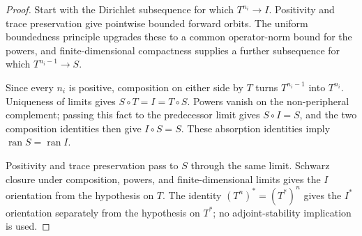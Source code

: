 \begin{proof}
    \leanok
    Start with the Dirichlet subsequence for which $T^{n_i}\to I$. Positivity
    and trace preservation give pointwise bounded forward orbits. The uniform
    boundedness principle upgrades these to a common operator-norm bound for
    the powers, and finite-dimensional compactness supplies a further
    subsequence for which $T^{n_i-1}\to S$.

    Since every $n_i$ is positive, composition on either side by $T$ turns
    $T^{n_i-1}$ into $T^{n_i}$. Uniqueness of limits gives
    $S\circ T=I=T\circ S$. Powers vanish on the non-peripheral complement;
    passing this fact to the predecessor limit gives $S\circ I=S$, and the
    two composition identities then give $I\circ S=S$. These absorption
    identities imply $\operatorname{ran}S=\operatorname{ran}I$.

    Positivity and trace preservation pass to $S$ through the same limit.
    Schwarz closure under composition, powers, and finite-dimensional limits
    gives the $I$ orientation from the hypothesis on $T$. The identity
    $(T^n)^*=(T^*)^n$ gives the $I^*$ orientation separately from the
    hypothesis on $T^*$; no adjoint-stability implication is used.
\end{proof}

